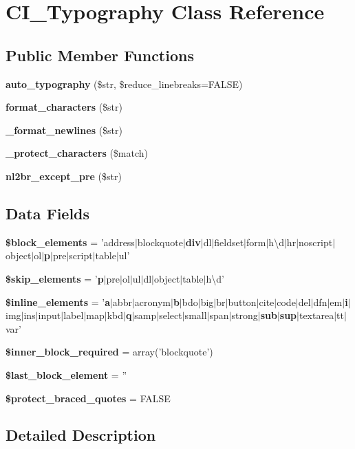 \section{C\-I\-\_\-\-Typography Class Reference}
\label{class_c_i___typography}
\subsection*{Public Member Functions}
\begin{DoxyCompactItemize}
\item 
{\bf auto\-\_\-typography} (\$str, \$reduce\-\_\-linebreaks=F\-A\-L\-S\-E)
\item 
{\bf format\-\_\-characters} (\$str)
\item 
{\bf \-\_\-format\-\_\-newlines} (\$str)
\item 
{\bf \-\_\-protect\-\_\-characters} (\$match)
\item 
{\bf nl2br\-\_\-except\-\_\-pre} (\$str)
\end{DoxyCompactItemize}
\subsection*{Data Fields}
\begin{DoxyCompactItemize}
\item 
{\bf \$block\-\_\-elements} = 'address$|$blockquote$|${\bf div}$|$dl$|$fieldset$|$form$|$h\textbackslash{}d$|$hr$|$noscript$|$object$|$ol$|${\bf p}$|$pre$|$script$|$table$|$ul'
\item 
{\bf \$skip\-\_\-elements} = '{\bf p}$|$pre$|$ol$|$ul$|$dl$|$object$|$table$|$h\textbackslash{}d'
\item 
{\bf \$inline\-\_\-elements} = '{\bf a}$|$abbr$|$acronym$|${\bf b}$|$bdo$|$big$|$br$|$button$|$cite$|$code$|$del$|$dfn$|$em$|${\bf i}$|$img$|$ins$|$input$|$label$|$map$|$kbd$|${\bf q}$|$samp$|$select$|$small$|$span$|$strong$|${\bf sub}$|${\bf sup}$|$textarea$|$tt$|$var'
\item 
{\bf \$inner\-\_\-block\-\_\-required} = array('blockquote')
\item 
{\bf \$last\-\_\-block\-\_\-element} = ''
\item 
{\bf \$protect\-\_\-braced\-\_\-quotes} = F\-A\-L\-S\-E
\end{DoxyCompactItemize}


\subsection{Detailed Description}



